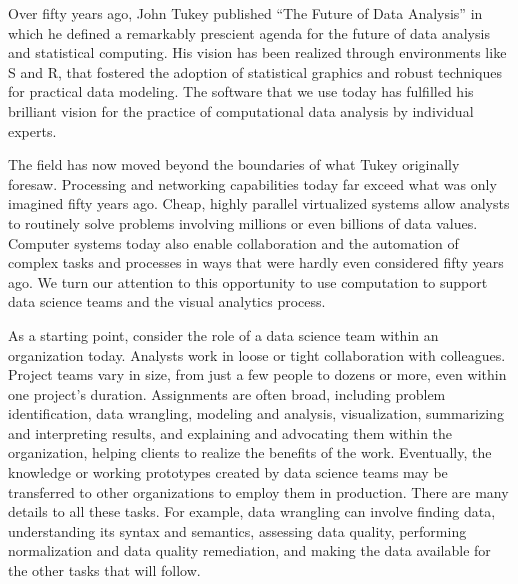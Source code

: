 
\maketitle

Over fifty years ago, John Tukey published ``The Future of Data Analysis''
in which he defined a remarkably prescient agenda for the future of
data analysis and statistical computing. His vision has been realized
through environments like S and R, that fostered the adoption of
statistical graphics and robust techniques for practical data modeling.
The software that we use today has fulfilled his brilliant vision for
the practice of computational data analysis by individual experts.

The field has now moved beyond the boundaries of what Tukey originally
foresaw. Processing and networking capabilities today far exceed
what was only imagined fifty years ago. Cheap, highly parallel
virtualized systems allow analysts to routinely solve problems
involving millions or even billions of data values. Computer
systems today also enable collaboration and the automation of
complex tasks and processes in ways that were hardly even considered
fifty years ago. We turn our attention to this opportunity to
use computation to support data science teams and the visual
analytics process.

As a starting point, consider the role of a data science team within
an organization today.
Analysts work in loose or tight collaboration with colleagues.
Project teams vary in size, from just a few people to dozens or
more, even within one project's duration. Assignments are often
broad, including problem identification, data wrangling, modeling and analysis,
visualization, summarizing and interpreting results, and explaining and advocating
them within the organization, helping clients to realize the benefits of the work.
Eventually, the knowledge or working prototypes created by data science teams
may be transferred to other organizations to employ them in production.
There are many details to all these tasks.  For example, data wrangling can involve
finding data, understanding its syntax and semantics, assessing data quality,
performing normalization and data quality remediation, and making the data available
for the other tasks that will follow.

